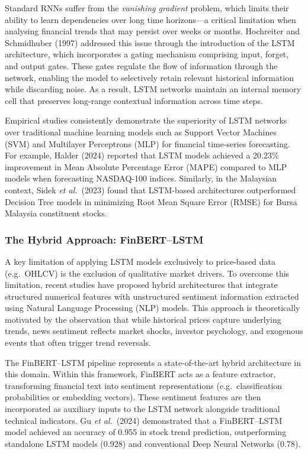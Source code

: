 \documentclass[singlespace]{ucetd}
\begin{document}
Standard RNNs suffer from the \emph{vanishing gradient} problem, which limits their ability to learn dependencies over long time horizons---a critical limitation when analysing financial trends that may persist over weeks or months. Hochreiter and Schmidhuber (1997) addressed this issue through the introduction of the LSTM architecture, which incorporates a gating mechanism comprising input, forget, and output gates. These gates regulate the flow of information through the network, enabling the model to selectively retain relevant historical information while discarding noise. As a result, LSTM networks maintain an internal memory cell that preserves long-range contextual information across time steps.

Empirical studies consistently demonstrate the superiority of LSTM networks over traditional machine learning models such as Support Vector Machines (SVM) and Multilayer Perceptrons (MLP) for financial time-series forecasting. For example, Halder (2024) reported that LSTM models achieved a 20.23\% improvement in Mean Absolute Percentage Error (MAPE) compared to MLP models when forecasting NASDAQ-100 indices. Similarly, in the Malaysian context, Sidek \textit{et al.}\ (2023) found that LSTM-based architectures outperformed Decision Tree models in minimizing Root Mean Square Error (RMSE) for Bursa Malaysia constituent stocks.

\subsubsection{The Hybrid Approach: FinBERT--LSTM}

A key limitation of applying LSTM models exclusively to price-based data (e.g.\ OHLCV) is the exclusion of qualitative market drivers. To overcome this limitation, recent studies have proposed hybrid architectures that integrate structured numerical features with unstructured sentiment information extracted using Natural Language Processing (NLP) models. This approach is theoretically motivated by the observation that while historical prices capture underlying trends, news sentiment reflects market shocks, investor psychology, and exogenous events that often trigger trend reversals.

The FinBERT--LSTM pipeline represents a state-of-the-art hybrid architecture in this domain. Within this framework, FinBERT acts as a feature extractor, transforming financial text into sentiment representations (e.g.\ classification probabilities or embedding vectors). These sentiment features are then incorporated as auxiliary inputs to the LSTM network alongside traditional technical indicators. Gu \textit{et al.}\ (2024) demonstrated that a FinBERT--LSTM model achieved an accuracy of 0.955 in stock trend prediction, outperforming standalone LSTM models (0.928) and conventional Deep Neural Networks (0.78). 
\end{document}
